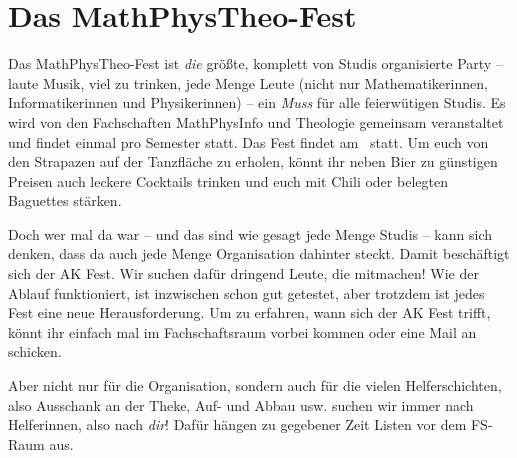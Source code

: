 \section{Das MathPhysTheo-Fest}
Das MathPhysTheo-Fest ist \emph{die} größte, komplett von Studis organisierte Party -- laute Musik, viel zu trinken, jede Menge Leute (nicht nur Mathematikerinnen, Informatikerinnen und Physikerinnen) -- ein \emph{Muss} für alle feierwütigen Studis. Es wird von den Fachschaften MathPhysInfo und Theologie gemeinsam veranstaltet und findet einmal pro Semester statt. Das Fest findet am \mathphystheotermin\ statt. Um euch von den Strapazen auf der Tanzfläche zu erholen, könnt ihr neben Bier zu günstigen Preisen auch leckere Cocktails trinken und euch mit Chili oder belegten Baguettes stärken.

Doch wer mal da war -- und das sind wie gesagt jede Menge Studis -- kann sich denken, dass da auch jede Menge Organisation dahinter steckt. Damit beschäftigt sich der AK Fest. Wir suchen dafür dringend Leute, die mitmachen! Wie der Ablauf funktioniert, ist inzwischen schon gut getestet, aber trotzdem ist jedes Fest eine neue Herausforderung. Um zu erfahren, wann sich der AK Fest trifft, könnt ihr einfach mal im Fachschaftsraum vorbei kommen oder eine Mail an  schicken.

Aber nicht nur für die Organisation, sondern auch für die vielen Helferschichten, also Ausschank an der Theke, Auf- und Abbau usw. suchen wir immer nach Helferinnen, also nach \emph{dir}! Dafür hängen zu gegebener Zeit Listen vor dem FS-Raum aus.
